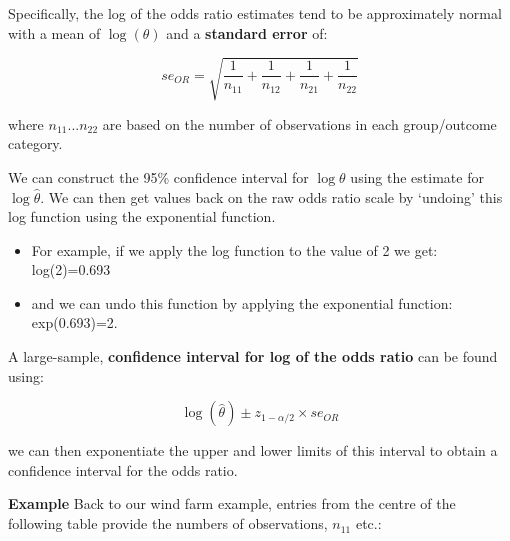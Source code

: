 \documentclass[
  oneside]{krantz}
\begin{document}
Specifically, the log of the odds ratio estimates tend to be approximately normal with a mean of \(\log(\theta)\) and a \textbf{standard error} of:

\[se_{OR}=\sqrt{\frac{1}{n_{11}}+\frac{1}{n_{12}}+\frac{1}{n_{21}}+\frac{1}{n_{22}}}\]

where \(n_{11}...n_{22}\) are based on the number of observations in each group/outcome category.

We can construct the 95\% confidence interval for \(\log\theta\) using the estimate for \(\log\hat{\theta}\). We can then get values back on the raw odds ratio scale by `undoing' this log function using the exponential function.

\begin{itemize}
\item
  For example, if we apply the log function to the value of 2 we get: log(2)=0.693
\item
  and we can undo this function by applying the exponential function: exp(0.693)=2.
\end{itemize}

A large-sample, \textbf{confidence interval for log of the odds ratio} can be found using:

\[\log(\hat{\theta}) \pm z_{1-\alpha/2} \times se_{OR}\]

we can then exponentiate the upper and lower limits of this interval to obtain a confidence interval for the odds ratio.

\textbf{Example} Back to our wind farm example, entries from the centre of the following table provide the numbers of observations, \(n_{11}\) etc.:
\end{document}
